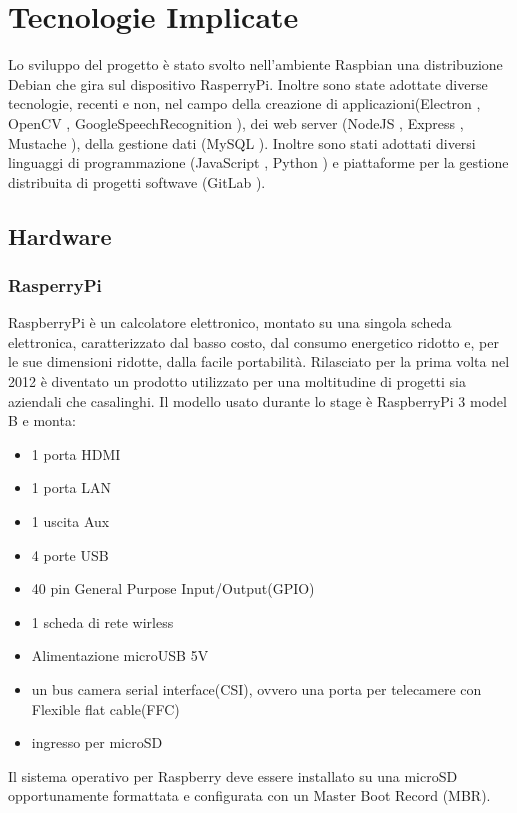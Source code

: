 \chapter{Tecnologie Implicate}

Lo sviluppo del progetto \`e stato svolto nell'ambiente Raspbian\cite{Raspbian}
una distribuzione Debian\cite{Debian} che gira sul dispositivo RasperryPi\cite{Raspberry}.
Inoltre sono state adottate diverse tecnologie, recenti
e non, nel campo della creazione di applicazioni(Electron \cite{Electron-website},
OpenCV \cite{OpenCV-website}, GoogleSpeechRecognition \cite{GoogleSTT-website}),
dei web server (NodeJS \cite{NodeJS-website}, Express \cite{Express-website}, Mustache \cite{Mustache}),
della gestione dati (MySQL \cite{MySQL}).
Inoltre sono stati adottati diversi linguaggi di programmazione (JavaScript \cite{JavaScript}, Python \cite{Python})
e piattaforme per la gestione distribuita di progetti softwave (GitLab \cite{git-website}).

\section{Hardware}
\subsection{RasperryPi}
RaspberryPi \`e un calcolatore elettronico, montato su una singola scheda elettronica,
caratterizzato dal basso costo, dal consumo energetico ridotto e, per le sue
dimensioni ridotte, dalla facile portabilit\`a.
Rilasciato per la prima volta nel 2012 \`e diventato un prodotto utilizzato per una moltitudine
di progetti sia aziendali che casalinghi.
Il modello usato durante lo stage \`e RaspberryPi 3 model B e monta:
\begin{itemize}
\item 1 porta HDMI
\item 1 porta LAN
\item 1 uscita Aux
\item 4 porte USB
\item 40 pin General Purpose Input/Output(GPIO)
\item 1 scheda di rete wirless
\item Alimentazione microUSB 5V
\item un bus camera serial interface(CSI), ovvero una porta per telecamere con Flexible flat cable(FFC)
\item ingresso per microSD
\end{itemize}
Il sistema operativo per Raspberry deve essere installato su una microSD opportunamente formattata
e configurata con un Master Boot Record (MBR).


